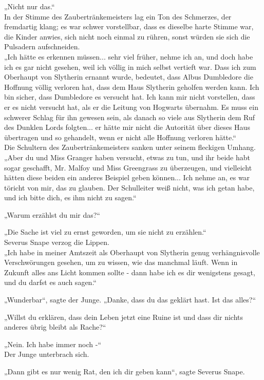 {„Nicht nur das.“\\ In der Stimme des Zaubertränkemeisters lag ein Ton des Schmerzes, der fremdartig klang; es war schwer vorstellbar, dass es dieselbe harte Stimme war, die Kinder anwies, sich nicht noch einmal zu rühren, sonst würden sie sich die Pulsadern aufschneiden.\\ „Ich hätte es erkennen müssen... sehr viel früher, nehme ich an, und doch habe ich es gar nicht gesehen, weil ich völlig in mich selbst vertieft war. Dass ich zum Oberhaupt von Slytherin ernannt wurde, bedeutet, dass Albus Dumbledore die Hoffnung völlig verloren hat, dass dem Haus Slytherin geholfen werden kann. Ich bin sicher, dass Dumbledore es versucht hat. Ich kann mir nicht vorstellen, dass er es nicht versucht hat, als er die Leitung von Hogwarts übernahm. Es muss ein schwerer Schlag für ihn gewesen sein, als danach so viele aus Slytherin dem Ruf des Dunklen Lords folgten... er hätte mir nicht die Autorität über dieses Haus übertragen und so gehandelt, wenn er nicht alle Hoffnung verloren hätte.“\\ Die Schultern des Zaubertränkemeisters sanken unter seinem fleckigen Umhang. „Aber du und Miss Granger haben versucht, etwas zu tun, und ihr beide habt sogar geschafft, Mr. Malfoy und Miss Greengrass zu überzeugen, und vielleicht hätten diese beiden ein anderes Beispiel geben können... Ich nehme an, es war töricht von mir, das zu glauben. Der Schulleiter weiß nicht, was ich getan habe, und ich bitte dich, es ihm nicht zu sagen.“

„Warum erzählst du mir das?“

„Die Sache ist viel zu ernst geworden, um sie nicht zu erzählen.“\\ Severus Snape verzog die Lippen.\\ „Ich habe in meiner Amtszeit als Oberhaupt von Slytherin genug verhängnisvolle Verschwörungen gesehen, um zu wissen, wie das manchmal läuft. Wenn in Zukunft alles ans Licht kommen sollte - dann habe ich es dir wenigstens gesagt, und du darfst es auch sagen.“

„Wunderbar“, sagte der Junge. „Danke, dass du das geklärt hast. Ist das alles?“

„Willst du erklären, dass dein Leben jetzt eine Ruine ist und dass dir nichts anderes übrig bleibt als Rache?“

„Nein. Ich habe immer noch -“\\ Der Junge unterbrach sich.

„Dann gibt es nur wenig Rat, den ich dir geben kann“, sagte Severus Snape.

}

